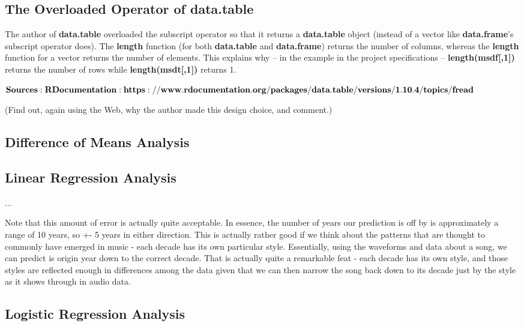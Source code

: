 \documentclass{article}
\begin{document}
\subsection{The Overloaded Operator of data.table}

The author of \textbf{data.table} overloaded the subscript operator so that it returns a \textbf{data.table} object (instead of a vector like \textbf{data.frame}'s subscript operator does). The \textbf{length} function (for both \textbf{data.table} and \textbf{data.frame}) returns the number of columns, whereas the \textbf{length} function for a vector returns the number of elements. This explains why -- in the example in the project specifications -- \textbf{length(msdf[,1])} returns the number of rows while \textbf{length(msdt[,1])} returns 1.

$\bf{Sources: RDocumentation: https://www.rdocumentation.org/packages/data.table/versions/1.10.4/topics/fread}$

(Find out, again using the Web, why the author made this design choice, and comment.)

\subsection{Difference of Means Analysis}

\subsection{Linear Regression Analysis}

...

Note that this amount of error is actually quite acceptable.  In essence, the number of years our prediction is off by is approximately a range of 10 years, so +- 5 years in either direction.  This is actually rather good if we think about the patterns that are thought to commonly have emerged in music - each decade has its own particular style.  Essentially, using the waveforms and data about a song, we can predict is origin year down to the correct decade.  That is actually quite a remarkable feat - each decade has its own style, and those styles are reflected enough in differences among the data given that we can then narrow the song back down to its decade just by the style as it shows through in audio data.

\subsection{Logistic Regression Analysis}
\end{document}
